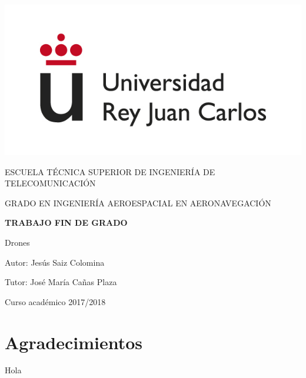 \documentclass[a4paper, 12pt, oneside]{book}
\begin{document}
\begin{titlepage}
	\begin{center}
		\vspace*{1mm}
		\begin{center}
			\includegraphics[width=0.8\linewidth]{img/logo.jpg}
		\end{center}
		\vspace{6.5mm}
		
		\fontsize{15.5}{14}\selectfont ESCUELA TÉCNICA SUPERIOR DE INGENIERÍA DE TELECOMUNICACIÓN
		\vspace{8mm}
		
		\fontsize{14}{14}\selectfont GRADO EN INGENIERÍA AEROESPACIAL EN AERONAVEGACIÓN
		
		\vspace{60pt}
		
		\fontsize{15.7}{14}\selectfont \textbf{TRABAJO FIN DE GRADO} 
		
		\vspace{20mm}
		\begin{huge}
			Drones 
		\end{huge}
		
		\vspace{20mm}
		
		\begin{large}
			Autor: Jesús Saiz Colomina
			
			Tutor: José María Cañas Plaza
			
			\vspace{7mm}
		\end{large}
		\begin{normalsize}
			Curso académico 2017/2018		
		\end{normalsize}
	\end{center}
\end{titlepage}

\thispagestyle{empty}
\afterpage{\null\newpage}
\newpage

\chapter*{Agradecimientos}
\hspace{1cm} Hola
\end{document}
